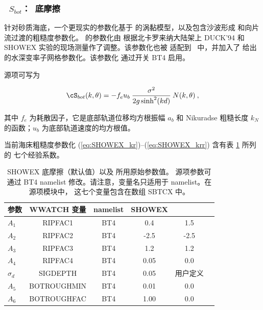 \vsssub
\subsubsection{~$S_{bot}$：\showex\ 底摩擦} \label{sec:BT4}
\vsssub


\noindent
针对砂质海底，一个更现实的参数化基于 \cite{art:GM79} 的涡黏模型，以及包含沙波形成
和向片流过渡的粗糙度参数化。\cite{tol:JPO94} 的参数化由 \cite{art:Aea03a}
根据北卡罗来纳大陆架上 DUCK'94 和 SHOWEX 实验的现场测量作了调整。该参数化也被
适配到 \ws\ 中，并加入了 \cite{tol:CE95} 给出的水深变率子网格参数化。该参数化
通过开关 BT4 启用。

源项可写为


\begin{equation}
\cS_{bot}(k,\theta) = - f_e u_b \: \frac{\sigma^2}{2 g \sinh^2(kd)} \: N(k,\theta)
\: , \label{eq:SHOWEX_bot}
\end{equation}

\noindent
其中 $f_e$ 为耗散因子，它是底部轨道位移均方根振幅 $a_b$ 和 Nikuradse 粗糙长度
$k_N$ 的函数；$u_b$ 为底部轨道速度的均方根值。

当前海床粗糙度参数化
(\ref{eq:SHOWEX_kr})--(\ref{eq:SHOWEX_krr}) 含有表 \ref{tab:BT4} 所列的
七个经验系数。

\begin{table} \begin{center}
\begin{tabular}{|l|c|c|c|c|c|} \hline \hline
参数         &  WWATCH 变量           & namelist &  SHOWEX  &  \cite{tol:JPO94} \\
\hline
  $A_1$ &  RIPFAC1                    & BT4 & 0.4     & 1.5    \\
  $A_2$ &  RIPFAC2                    & BT4 & -2.5    & -2.5   \\
  $A_3$ &  RIPFAC3                    & BT4 & 1.2     & 1.2     \\
  $A_4$ &  RIPFAC4                    & BT4 & 0.05    & 0.0     \\
  $\sigma_d$ &  SIGDEPTH              & BT4 & 0.05    & 用户定义  \\
  $A_5$ &  BOTROUGHMIN                & BT4 & 0.01    & 0.0     \\
  $A_6$ &  BOTROUGHFAC                & BT4 & 1.00    & 0.0     \\
\hline
\end{tabular} \end{center}
\caption{SHOWEX 底摩擦（默认值）以及 \cite{tol:JPO94} 所用原始参数值。
源项参数可通过 BT4 namelist 修改。请注意，变量名只适用于 namelist。在源项模块中，
这七个变量包含在数组 SBTCX 中。} \label{tab:BT4}
\botline
\end{table}

